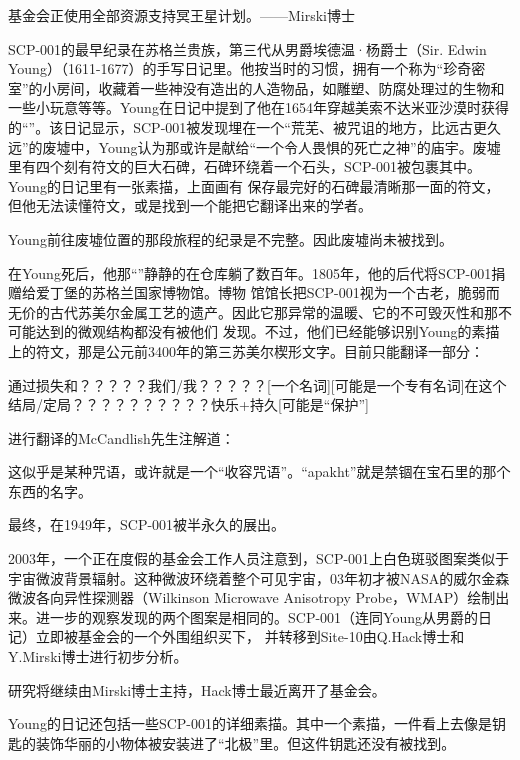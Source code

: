 \begin{scpbox}


\end{scpbox}

\begin{scpbox}

基金会正使用全部资源支持冥王星计划。——Mirski博士

\end{scpbox}


SCP-001的最早纪录在苏格兰贵族，第三代从男爵埃德温·杨爵士（Sir. Edwin Young）（1611-1677）的手写日记里。他按当时的习惯，拥有一个称为“珍奇密室”的小房间，收藏着一些神没有造出的人造物品，如雕塑、防腐处理过的生物和一些小玩意等等。Young在日记中提到了他在1654年穿越美索不达米亚沙漠时获得的“”。该日记显示，SCP-001被发现埋在一个“荒芜、被咒诅的地方，比远古更久远”的废墟中，Young认为那或许是献给“一个令人畏惧的死亡之神”的庙宇。废墟里有四个刻有符文的巨大石碑，石碑环绕着一个石头，SCP-001被包裹其中。Young的日记里有一张素描，上面画有 保存最完好的石碑最清晰那一面的符文，但他无法读懂符文，或是找到一个能把它翻译出来的学者。

Young前往废墟位置的那段旅程的纪录是不完整。因此废墟尚未被找到。

在Young死后，他那“”静静的在仓库躺了数百年。1805年，他的后代将SCP-001捐赠给爱丁堡的苏格兰国家博物馆。博物 馆馆长把SCP-001视为一个古老，脆弱而无价的古代苏美尔金属工艺的遗产。因此它那异常的温暖、它的不可毁灭性和那不可能达到的微观结构都没有被他们 发现。不过，他们已经能够识别Young的素描上的符文，那是公元前3400年的第三苏美尔楔形文字。目前只能翻译一部分：

\begin{scpbox}

通过损失和？？？？？我们\slash 我？？？？？[一个名词][可能是一个专有名词]在这个结局\slash 定局？？？？？？？？？？快乐+持久[可能是“保护”]

\end{scpbox}

进行翻译的McCandlish先生注解道：

\begin{scpbox}

这似乎是某种咒语，或许就是一个“收容咒语”。“apakht”就是禁锢在宝石里的那个东西的名字。

\end{scpbox}

最终，在1949年，SCP-001被半永久的展出。

2003年，一个正在度假的基金会工作人员注意到，SCP-001上白色斑驳图案类似于宇宙微波背景辐射。这种微波环绕着整个可见宇宙，03年初才被NASA的威尔金森微波各向异性探测器（Wilkinson Microwave Anisotropy Probe，WMAP）绘制出来。进一步的观察发现的两个图案是相同的。SCP-001（连同Young从男爵的日记）立即被基金会的一个外围组织买下， 并转移到Site-10由Q.Hack博士和Y.Mirski博士进行初步分析。

研究将继续由Mirski博士主持，Hack博士最近离开了基金会。

Young的日记还包括一些SCP-001的详细素描。其中一个素描，一件看上去像是钥匙的装饰华丽的小物体被安装进了“北极”里。但这件钥匙还没有被找到。
